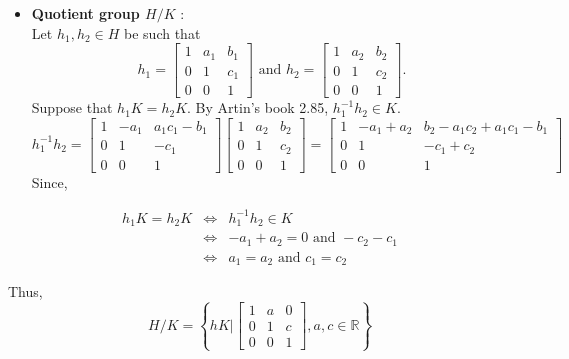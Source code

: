 \documentclass[
]{book}
\providecommand{\tightlist}{%
  \setlength{\itemsep}{0pt}\setlength{\parskip}{0pt}}
\theoremstyle{definition}
\theoremstyle{definition}
\theoremstyle{definition}
\theoremstyle{definition}
\theoremstyle{remark}
\begin{document}
\begin{itemize}
\tightlist
\item
  \textbf{Quotient group \(H/K\)} :\\
  Let \(h_1,h_2\in H\) be such that
  \[h_1=\begin{bmatrix} 1 & a_1 & b_1 \\0 & 1 & c_1\\ 0 & 0  & 1\end{bmatrix} \text{ and } 
  h_2=\begin{bmatrix} 1 & a_2 & b_2 \\0 & 1 & c_2\\ 0 & 0  & 1\end{bmatrix}.\]
  Suppose that \(h_1K=h_2K\). By Artin's book 2.85, \(h_1^{-1}h_2\in K\).
  \[h_1^{-1}h_2=
  \begin{bmatrix} 1 & -a_1 & a_1c_1-b_1 \\0 & 1 & -c_1\\ 0 & 0  & 1\end{bmatrix}
  \begin{bmatrix} 1 & a_2 & b_2 \\0 & 1 & c_2\\ 0 & 0  & 1\end{bmatrix}
  =\begin{bmatrix} 1 & -a_1+a_2 & b_2-a_1c_2+a_1c_1-b_1 \\0 & 1 & -c_1+c_2\\ 0 & 0  & 1\end{bmatrix}\]
  Since,
\end{itemize}

\begin{eqnarray}
h_1K=h_2K & \iff & h_1^{-1}h_2\in K\\
& \iff &  -a_1+a_2=0 \text{ and }-c_2-c_1\\
& \iff &  a_1=a_2\text{ and }c_1=c_2
\end{eqnarray}

Thus,
\[H/K=\left\{hK\Biggr | \begin{bmatrix} 1 & a & 0 \\0 & 1 & c\\ 0 & 0  & 1\end{bmatrix}, a,c\in \mathbb{R}\right\}\]
\end{document}
